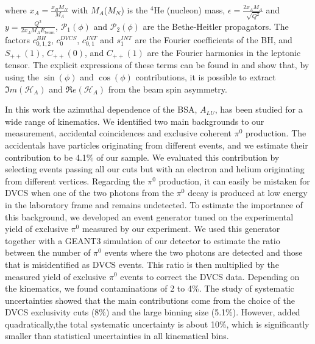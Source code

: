 \documentclass[twocolumn,nofootinbib,showpacs,prl,superscriptaddress,secnumarabic,amssymb,nobibnotes,aps,floatfix]{revtex4}
\begin{document}
where $x_{A} = \frac{x_{B}M_{N}}{M_{A}}$ with $M_{A}$($M_{N}$) is the $^4$He 
(nucleon) mass, $\epsilon = \frac{2x_{A}M_{A}}{\sqrt{Q^{2}}}$ and 
$y=\frac{Q^{2}}{2x_{A}M_{A}E_{beam}}$, $\mathcal{P}_1(\phi)$ and $\mathcal 
{P}_2(\phi)$ are the Bethe-Heitler propagators. The factors $c_{0,1,2}^{BH}$, 
$c_0^{DVCS}$, $c_{0,1}^{INT}$ and $s_1^{INT}$ are the Fourier coefficients of 
the BH, and $S_{++}(1)$, $C_{++}(0)$, and $C_{++}(1)$ are the Fourier harmonics 
in the leptonic tensor.  The explicit expressions of these terms can be found 
in \cite{Belitsky:2008bz} and show that, by using the $\sin(\phi)$ and 
$\cos(\phi)$ contributions, it is possible to extract $\Im m(\mathcal{H}_{A})$ 
and $\Re e(\mathcal{H}_{A})$ from the beam spin
asymmetry. 

In this work the azimuthal dependence of the BSA, $A_{LU}$, has been studied 
for a wide range of kinematics. We identified two main backgrounds to our 
measurement, accidental coincidences and exclusive coherent $\pi^0$ production.  
The accidentals have particles originating from different events, and we 
estimate their  contribution to be 4.1\% of our sample. We evaluated this 
contribution by selecting events passing all our cuts but with an electron and 
helium originating from different vertices. Regarding the $\pi^0$ production, 
it can easily be mistaken for DVCS when one of the two photons from the $\pi^0$ 
decay is produced at low energy in the laboratory frame and remains undetected.  
To estimate the importance of this background, we developed an event generator 
tuned on the experimental yield of exclusive $\pi^0$ measured by our 
experiment. We used this generator together with a GEANT3 simulation of our 
detector to estimate the ratio between the number of $\pi^0$ events where the 
two photons are detected and those that is misidentified as DVCS events. This 
ratio is then multiplied by the measured yield of exclusive $\pi^0$ events to 
correct the DVCS data.  Depending on the kinematics, we found contaminations of 
2 to 4\%. The study of systematic uncertainties showed that the main 
contributions come from the choice of the DVCS exclusivity cuts (8\%) and the 
large binning size (5.1\%). However, added quadratically,the total systematic 
uncertainty is about 10\%, which is significantly smaller than statistical 
uncertainties in all kinematical bins. 
\end{document}
